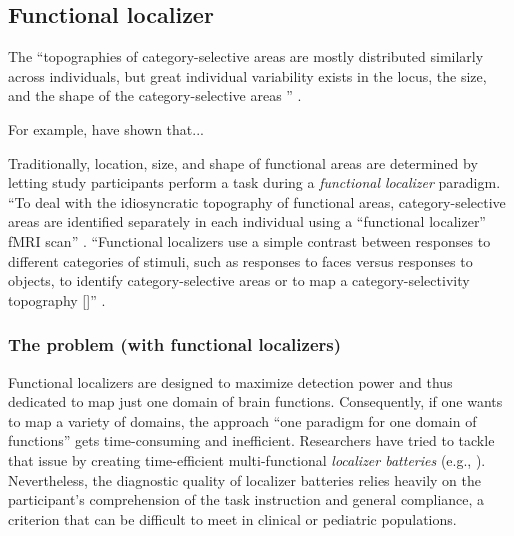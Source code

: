 \subsection{Functional localizer}


The ``topographies of category-selective areas are mostly distributed similarly
across individuals, but great individual variability exists in the locus, the
size, and the shape of the category-selective areas \citep{zhen2015quantifying,
zhen2017quantifying} '' \citep{jiahui2020predicting}.


For example, \citep{frost2012measuring, weiner2018defining,
rosenke2021probabilistic, wang2015probabilistic} have shown that...


Traditionally, location, size, and shape of functional areas are determined by
letting study participants perform a task during a \textit{functional localizer}
paradigm.
%
``To deal with the idiosyncratic topography of functional areas,
category-selective areas are identified separately in each individual using a
``functional localizer'' fMRI scan'' \citep{jiahui2020predicting}.
%
``Functional localizers use a simple contrast between responses to different
categories of stimuli, such as responses to faces versus responses to objects,
to identify category-selective areas or to map a category-selectivity topography
[\citep{saxe2006divide}]'' \citep{jiahui2020predicting}.


\subsubsection{The problem (with functional localizers)}

Functional localizers are designed to maximize detection power and thus
dedicated to map just one domain of brain functions.
Consequently, if one wants to map a variety of domains, the approach ``one
paradigm for one domain of functions'' gets time-consuming and inefficient.
Researchers have tried to tackle that issue by creating time-efficient
multi-functional \textit{localizer batteries} (e.g., \citep{barch2013function,
drobyshevsky2006rapid, pinel2007fast}).
Nevertheless, the diagnostic quality of localizer batteries relies heavily on
the participant's comprehension of the task instruction and general compliance,
a criterion that can be difficult to meet in clinical or pediatric populations.


